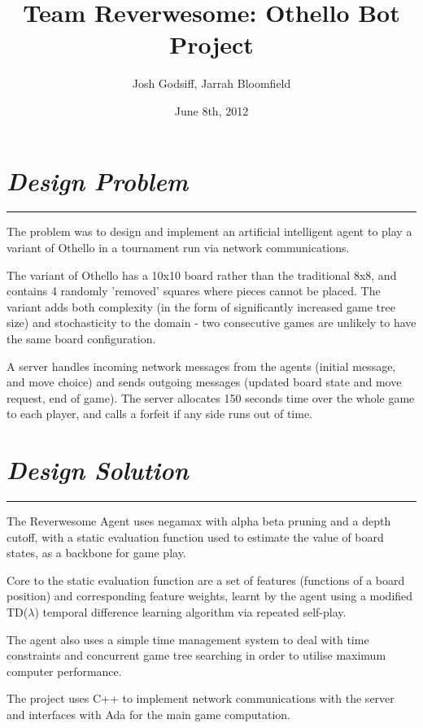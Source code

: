 \documentclass[10pt]{report}
\begin{document}
\date{June 8th, 2012}
\title{Team Reverwesome: Othello Bot Project}
\author{Josh Godsiff, Jarrah Bloomfield}
\maketitle

\setlength{\columnsep}{22.0pt}
\begin{multicols}{2}

\section*{\emph{Design Problem}}
\hrule

The problem was to design and implement an artificial intelligent agent to play a variant of Othello in a tournament run via network communications.

The variant of Othello has a 10x10 board rather than the traditional 8x8, and contains 4 randomly 'removed' squares where pieces cannot be placed. The variant adds both complexity (in the form of significantly increased game tree size) and stochasticity to the domain - two consecutive games are unlikely to have the same board configuration.

A server handles incoming network messages from the agents (initial message, and move choice) and sends outgoing messages (updated board state and move request, end of game). The server allocates 150 seconds time over the whole game to each player, and calls a forfeit if any side runs out of time.

\section*{\emph{Design Solution}}
\hrule

The Reverwesome Agent uses negamax with alpha beta pruning and a depth cutoff, with a static evaluation function used to estimate the value of board states, as a backbone for game play.

Core to the static evaluation function are a set of features (functions of a board position) and corresponding feature weights, learnt by the agent using a modified TD($\lambda$) temporal difference learning algorithm via repeated self-play.

The agent also uses a simple time management system to deal with time constraints and concurrent game tree searching in order to utilise maximum computer performance.

The project uses C++ to implement network communications with the server and interfaces with Ada for the main game computation.


\end{multicols}
\end{document}
